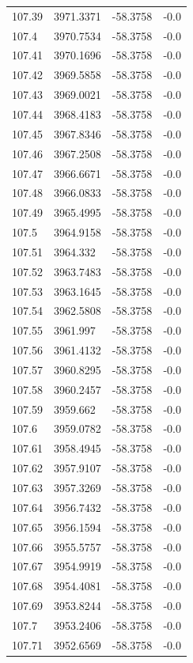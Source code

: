 \begin{table}[H]
\begin{tabular}{llll}
107.39 & 3971.3371 & -58.3758 & -0.0 \\
107.4 & 3970.7534 & -58.3758 & -0.0 \\
107.41 & 3970.1696 & -58.3758 & -0.0 \\
107.42 & 3969.5858 & -58.3758 & -0.0 \\
107.43 & 3969.0021 & -58.3758 & -0.0 \\
107.44 & 3968.4183 & -58.3758 & -0.0 \\
107.45 & 3967.8346 & -58.3758 & -0.0 \\
107.46 & 3967.2508 & -58.3758 & -0.0 \\
107.47 & 3966.6671 & -58.3758 & -0.0 \\
107.48 & 3966.0833 & -58.3758 & -0.0 \\
107.49 & 3965.4995 & -58.3758 & -0.0 \\
107.5 & 3964.9158 & -58.3758 & -0.0 \\
107.51 & 3964.332 & -58.3758 & -0.0 \\
107.52 & 3963.7483 & -58.3758 & -0.0 \\
107.53 & 3963.1645 & -58.3758 & -0.0 \\
107.54 & 3962.5808 & -58.3758 & -0.0 \\
107.55 & 3961.997 & -58.3758 & -0.0 \\
107.56 & 3961.4132 & -58.3758 & -0.0 \\
107.57 & 3960.8295 & -58.3758 & -0.0 \\
107.58 & 3960.2457 & -58.3758 & -0.0 \\
107.59 & 3959.662 & -58.3758 & -0.0 \\
107.6 & 3959.0782 & -58.3758 & -0.0 \\
107.61 & 3958.4945 & -58.3758 & -0.0 \\
107.62 & 3957.9107 & -58.3758 & -0.0 \\
107.63 & 3957.3269 & -58.3758 & -0.0 \\
107.64 & 3956.7432 & -58.3758 & -0.0 \\
107.65 & 3956.1594 & -58.3758 & -0.0 \\
107.66 & 3955.5757 & -58.3758 & -0.0 \\
107.67 & 3954.9919 & -58.3758 & -0.0 \\
107.68 & 3954.4081 & -58.3758 & -0.0 \\
107.69 & 3953.8244 & -58.3758 & -0.0 \\
107.7 & 3953.2406 & -58.3758 & -0.0 \\
107.71 & 3952.6569 & -58.3758 & -0.0 \\

\end{tabular}
\end{table}
